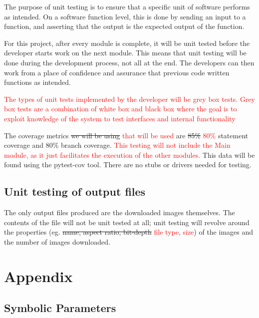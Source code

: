 \documentclass[12pt, titlepage]{article}
\begin{document}
The purpose of unit testing is to ensure that a specific unit of software performs as intended. On a software function level, this is done by sending an input to a function, and asserting that the output is the expected output of the function.

For this project, after every module is complete, it will be unit tested before the developer starts work on the next module. This means that unit testing will be done during the development process, not all at the end. The developers can then work from a place of confidence and assurance that previous code written functions as intended.

\textcolor{red}{The types of unit tests implemented by the developer will be grey box tests. Grey box tests are a
combination of white box and black box where the goal is to exploit knowledge of the system to test interfaces and 
internal functionality}

The coverage metrics \sout{we will be using} \textcolor{red}{that will be used} are \sout{85\%} \textcolor{red}{80\%} statement coverage and 
80\% branch coverage. \textcolor{red}{This testing will not include the Main module, as it just facilitates the execution of the other modules.} This data will be found using the pytest-cov tool. There are no stubs 
or drivers needed for testing.
		
\subsection{Unit testing of output files}

The only output files produced are the downloaded images themselves. The contents of the file will not be unit 
tested at all; unit testing will revolve around the properties (eg. \sout{name, aspect ratio, bit-depth} \textcolor{red}{
file type, size}) of the images and the number of images downloaded.

%

%

\newpage

\section{Appendix}

\subsection{Symbolic Parameters}
\end{document}
